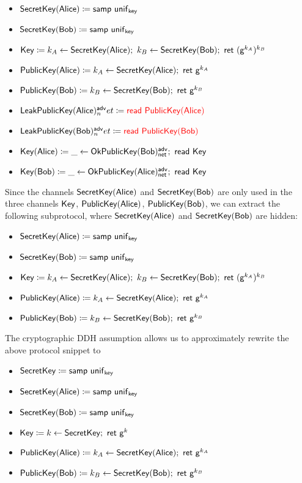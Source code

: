 \begin{itemize}
\item $\mathsf{SecretKey}(\mathsf{Alice}) \coloneqq \mathsf{samp} \ \mathsf{unif}_{\mathsf{key}}$
\item $\mathsf{SecretKey}(\mathsf{Bob}) \coloneqq \mathsf{samp} \ \mathsf{unif}_{\mathsf{key}}$
\item $\Key \coloneqq k_A \leftarrow \SecretKey(\Alice); \ k_B \leftarrow \SecretKey(\Bob); \ \ret{(\gen^{k_A})^{k_B}}$
\item {\color{red} $\PublicKey(\Alice) \coloneqq k_A \leftarrow \SecretKey(\Alice); \ \ret{\gen^{k_A}}$}
\item {\color{red} $\mathsf{PublicKey}(\mathsf{Bob}) \coloneqq k_B \leftarrow \mathsf{SecretKey}(\mathsf{Bob}); \ \mathsf{ret} \ \mathsf{g}^{k_B}$}
\item $\mathsf{LeakPublicKey}(\mathsf{Alice})^{\mathsf{adv}}_net \coloneqq {\color{red} \mathsf{read} \ \mathsf{PublicKey}(\mathsf{Alice})}$
\item $\mathsf{LeakPublicKey}(\mathsf{Bob})^{\mathsf{adv}}_net \coloneqq {\color{red} \mathsf{read} \ \mathsf{PublicKey}(\mathsf{Bob})}$
\item $\mathsf{Key}(\mathsf{Alice}) \coloneqq \_ \leftarrow \mathsf{OkPublicKey}(\mathsf{Bob})^{\mathsf{adv}}_{\mathsf{net}}; \ \mathsf{read} \ \mathsf{Key}$
\item $\mathsf{Key}(\mathsf{Bob}) \coloneqq \_ \leftarrow \mathsf{OkPublicKey}(\mathsf{Alice})^{\mathsf{adv}}_{\mathsf{net}}; \ \mathsf{read} \ \mathsf{Key}$
\end{itemize}

\noindent Since the channels $\mathsf{SecretKey}(\mathsf{Alice})$ and $\mathsf{SecretKey}(\mathsf{Bob})$ are only used in the three channels $\mathsf{Key}$, $\mathsf{PublicKey}(\mathsf{Alice})$, $\mathsf{PublicKey}(\mathsf{Bob})$, we can extract the following subprotocol, where $\mathsf{SecretKey}(\mathsf{Alice})$ and $\mathsf{SecretKey}(\mathsf{Bob})$ are hidden:

\begin{itemize}
\item $\mathsf{SecretKey}(\mathsf{Alice}) \coloneqq \mathsf{samp} \ \mathsf{unif}_{\mathsf{key}}$
\item $\mathsf{SecretKey}(\mathsf{Bob}) \coloneqq \mathsf{samp} \ \mathsf{unif}_{\mathsf{key}}$
\item $\Key \coloneqq k_A \leftarrow \SecretKey(\Alice); \ k_B \leftarrow \SecretKey(\Bob); \ \ret{(\gen^{k_A})^{k_B}}$
\item $\PublicKey(\Alice) \coloneqq k_A \leftarrow \SecretKey(\Alice); \ \ret{\gen^{k_A}}$
\item $\mathsf{PublicKey}(\mathsf{Bob}) \coloneqq k_B \leftarrow \mathsf{SecretKey}(\mathsf{Bob}); \ \mathsf{ret} \ \mathsf{g}^{k_B}$
\end{itemize}

\noindent The cryptographic DDH assumption allows us to approximately rewrite the above protocol snippet to

\begin{itemize}
\item $\mathsf{SecretKey} \coloneqq \mathsf{samp} \ \mathsf{unif}_{\mathsf{key}}$
\item $\mathsf{SecretKey}(\mathsf{Alice}) \coloneqq \mathsf{samp} \ \mathsf{unif}_{\mathsf{key}}$
\item $\mathsf{SecretKey}(\mathsf{Bob}) \coloneqq \mathsf{samp} \ \mathsf{unif}_{\mathsf{key}}$
\item $\mathsf{Key} \coloneqq k \leftarrow \mathsf{SecretKey}; \ \mathsf{ret} \ \mathsf{g}^k$
\item $\PublicKey(\Alice) \coloneqq k_A \leftarrow \SecretKey(\Alice); \ \ret{\gen^{k_A}}$
\item $\mathsf{PublicKey}(\mathsf{Bob}) \coloneqq k_B \leftarrow \mathsf{SecretKey}(\mathsf{Bob}); \ \mathsf{ret} \ \mathsf{g}^{k_B}$
\end{itemize}

